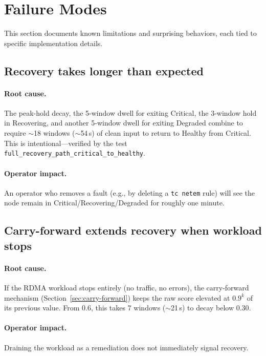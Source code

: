 \documentclass[11pt]{article}
\begin{document}
\section{Failure Modes}
\label{sec:failure-modes}

This section documents known limitations and surprising behaviors, each tied
to specific implementation details.

\subsection{Recovery takes longer than expected}

\paragraph{Root cause.}
The peak-hold decay, the 5-window dwell for exiting Critical, the 3-window
hold in Recovering, and another 5-window dwell for exiting Degraded combine
to require $\sim$18 windows ($\sim$54\,s) of clean input to return to Healthy
from Critical. This is intentional---verified by the test
\texttt{full\_recovery\_path\_critical\_to\_healthy}.

\paragraph{Operator impact.}
An operator who removes a fault (e.g., by deleting a \texttt{tc netem}
rule) will see the node remain in Critical/Recovering/Degraded for roughly
one minute.

\subsection{Carry-forward extends recovery when workload stops}

\paragraph{Root cause.}
If the RDMA workload stops entirely (no traffic, no errors), the carry-forward
mechanism (Section~\ref{sec:carry-forward}) keeps the raw score elevated at
$0.9^k$ of its previous value. From $0.6$, this takes 7 windows ($\sim$21\,s)
to decay below $0.30$.

\paragraph{Operator impact.}
Draining the workload as a remediation does not immediately signal recovery.
\end{document}
